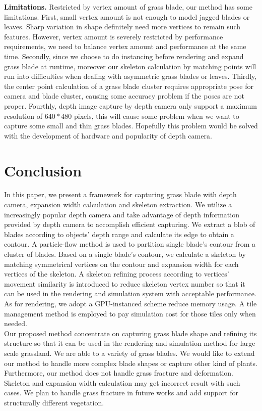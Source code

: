 \documentclass[10pt,journal,compsoc]{IEEEtran}
\begin{document}
\textbf{Limitations.} Restricted by vertex amount of grass blade, our method has some limitations. First, small vertex amount is not enough to model jagged blades or leaves. Sharp variation in shape definitely need more vertices to remain such features. However, vertex amount is severely restricted by performance requirements, we need to balance vertex amount and performance at the same time. Secondly, since we choose to do instancing before rendering and expand grass blade at runtime, moreover our skeleton calculation by matching points will run into difficulties when dealing with asymmetric grass blades or leaves. Thirdly, the center point calculation of a grass blade cluster requires appropriate pose for camera and blade cluster, causing some accuracy problem if the poses are not proper. Fourthly, depth image capture by depth camera only support a maximum resolution of $640*480$ pixels, this will cause some problem when we want to capture some small and thin grass blades. Hopefully this problem would be solved with the development of hardware and popularity of depth camera.

\section{Conclusion}
In this paper, we present a framework for capturing grass blade with depth camera, expansion width calculation and skeleton extraction. We utilize a increasingly popular depth camera and take advantage of depth information provided by depth camera to accomplish efficient capturing. We extract a blob of blades according to objects' depth range and calculate its edge to obtain a contour. A particle-flow method is used to partition single blade's contour from a cluster of blades. Based on a single blade's contour, we calculate a skeleton by matching symmetrical vertices on the contour and expansion width for each vertices of the skeleton. A skeleton refining process according to vertices' movement similarity is introduced to reduce skeleton vertex number so that it can be used in the rendering and simulation system with acceptable performance. As for rendering, we adopt a GPU-instanced scheme reduce memory usage. A tile management method is employed to pay simulation cost for those tiles only when needed.\\

Our proposed method concentrate on capturing grass blade shape and refining its structure so that it can be used in the rendering and simulation method for large scale grassland. We are able to a variety of grass blades. We would like to extend our method to handle more complex blade shapes or capture other kind of plants. Furthermore, our method does not handle grass fracture and deformation. Skeleton and expansion width calculation may get incorrect result with such cases. We plan to handle grass fracture in future works and add support for structurally different vegetation.\\
\end{document}
